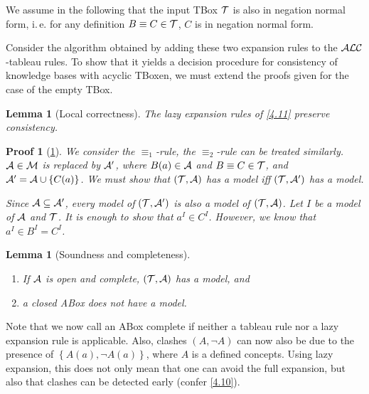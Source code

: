 \documentclass[openany]{scrbook}
\theoremstyle{break}
\newtheorem{Lemma}[Theorem]{Lemma}
\theoremstyle{nonumberbreak}
\theoremstyle{nonumberplain}
\theoremstyle{nonumberbreak}
\newtheorem{Proof}{Proof}
\newcommand{\set}[1]{\left\{#1\right\}}
\newcommand{\ie}{i{.}\,e{.}\xspace}
\newcommand{\ALC}{{\cal A}{\cal L}{\cal C}}
\begin{document}
We assume in the following that the input TBox ${\cal T}$ is also in
negation normal form, \ie for any definition $B \equiv C \in {\cal
  T}$, $C$ is in negation normal form.

Consider the algorithm obtained by adding these two expansion rules to
the $\ALC$-tableau rules. To show that it yields a decision procedure
for consistency of knowledge bases with acyclic TBoxen, we must extend
the proofs given for the case of the empty TBox.

\begin{Lemma}[Local correctness]
  \label{4.12}
  The lazy expansion rules of \cref{4.11} preserve consistency.
\end{Lemma}

\begin{Proof}[\cref{4.12}]
  We consider the $\equiv_1$-rule, the $\equiv_2$-rule can be treated
  similarly. ${\cal A} \in {\cal M}$ is replaced by ${\cal A}'$, where
  $B(a) \in {\cal A}$ and $B \equiv C \in {\cal T}$, and ${\cal A}' =
  {\cal A} \cup \set{C(a)}$. We must show that $({\cal T}, {\cal A})$
  has a model iff $({\cal T}, {\cal A}')$ has a model.

  Since ${\cal A} \subseteq {\cal A}'$, every model of $({\cal T},
  {\cal A}')$ is also a model of $({\cal T}, {\cal A})$. Let $I$ be a
  model of ${\cal A}$ and ${\cal T}$. It is enough to show that $a^I
  \in C^I$. However, we know that $a^I \in B^I = C^I$.
\end{Proof}

\begin{Lemma}[Soundness and completeness]
  \label{4.13}
  \begin{enumerate}
  \item If ${\cal A}$ is open and complete, $({\cal T}, {\cal A})$ has
    a model, and
  \item a closed ABox does not have a model.
  \end{enumerate}
\end{Lemma}

Note that we now call an ABox complete if neither a tableau rule nor a
lazy expansion rule is applicable. Also, clashes $(A, \neg A)$ can now
also be due to the presence of $\set{A(a), \neg A(a)}$, where $A$ is a
defined concepts. Using lazy expansion, this does not only mean that
one can avoid the full expansion, but also that clashes can be
detected early (confer \cref{4.10}).
\end{document}
